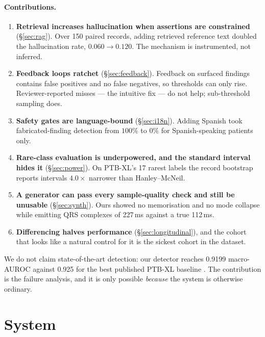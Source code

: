 \documentclass[pmlr,twocolumn,10pt]{jmlr}
\begin{document}
\paragraph{Contributions.}
\begin{enumerate}
\item \textbf{Retrieval increases hallucination when assertions are constrained}
(\S\ref{sec:rag}). Over 150 paired records, adding retrieved reference text doubled the
hallucination rate, $0.060 \rightarrow 0.120$. The mechanism is instrumented, not inferred.
\item \textbf{Feedback loops ratchet} (\S\ref{sec:feedback}). Feedback on surfaced findings
contains false positives and no false negatives, so thresholds can only rise. Reviewer-reported
misses --- the intuitive fix --- do not help; sub-threshold sampling does.
\item \textbf{Safety gates are language-bound} (\S\ref{sec:i18n}). Adding Spanish took
fabricated-finding detection from $100\%$ to $0\%$ for Spanish-speaking patients only.
\item \textbf{Rare-class evaluation is underpowered, and the standard interval hides it}
(\S\ref{sec:power}). On PTB-XL's 17 rarest labels the record bootstrap reports intervals
$4.0\times$ narrower than Hanley--McNeil.
\item \textbf{A generator can pass every sample-quality check and still be unusable}
(\S\ref{sec:synth}). Ours showed no memorisation and no mode collapse while emitting QRS
complexes of 227\,ms against a true 112\,ms.
\item \textbf{Differencing halves performance} (\S\ref{sec:longitudinal}), and the cohort
that looks like a natural control for it is the sickest cohort in the dataset.
\end{enumerate}

We do not claim state-of-the-art detection: our detector reaches 0.9199 macro-AUROC against
0.925 for the best published PTB-XL baseline \citep{strodthoff2021deep}. The contribution is
the failure analysis, and it is only possible \emph{because} the system is otherwise ordinary.

\section{System}
\label{sec:system}
\end{document}

